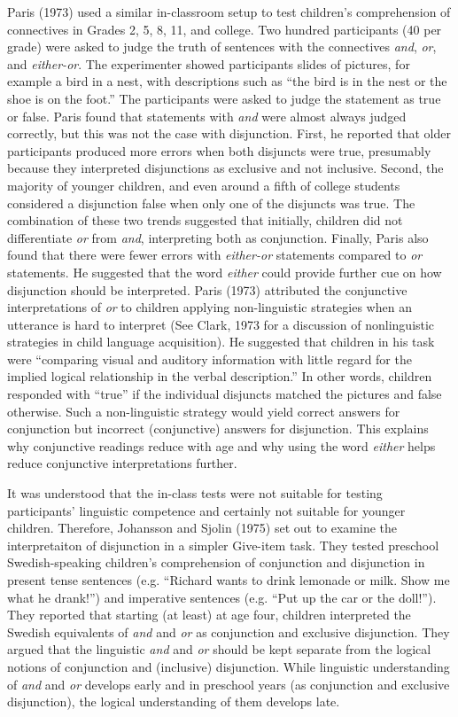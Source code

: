 \documentclass[floatsintext,man]{apa6}
\theoremstyle{definition}
\theoremstyle{definition}
\theoremstyle{definition}
\theoremstyle{remark}
\begin{document}
Paris (1973) used a similar in-classroom setup to test children's
comprehension of connectives in Grades 2, 5, 8, 11, and college. Two
hundred participants (40 per grade) were asked to judge the truth of
sentences with the connectives \emph{and}, \emph{or}, and
\emph{either-or}. The experimenter showed participants slides of
pictures, for example a bird in a nest, with descriptions such as
\enquote{the bird is in the nest or the shoe is on the foot.} The
participants were asked to judge the statement as true or false. Paris
found that statements with \emph{and} were almost always judged
correctly, but this was not the case with disjunction. First, he
reported that older participants produced more errors when both
disjuncts were true, presumably because they interpreted disjunctions as
exclusive and not inclusive. Second, the majority of younger children,
and even around a fifth of college students considered a disjunction
false when only one of the disjuncts was true. The combination of these
two trends suggested that initially, children did not differentiate
\emph{or} from \emph{and}, interpreting both as conjunction. Finally,
Paris also found that there were fewer errors with \emph{either-or}
statements compared to \emph{or} statements. He suggested that the word
\emph{either} could provide further cue on how disjunction should be
interpreted. Paris (1973) attributed the conjunctive interpretations of
\emph{or} to children applying non-linguistic strategies when an
utterance is hard to interpret (See Clark, 1973 for a discussion of
nonlinguistic strategies in child language acquisition). He suggested
that children in his task were \enquote{comparing visual and auditory
information with little regard for the implied logical relationship in
the verbal description.} In other words, children responded with
\enquote{true} if the individual disjuncts matched the pictures and
false otherwise. Such a non-linguistic strategy would yield correct
answers for conjunction but incorrect (conjunctive) answers for
disjunction. This explains why conjunctive readings reduce with age and
why using the word \emph{either} helps reduce conjunctive
interpretations further.

It was understood that the in-class tests were not suitable for testing
participants' linguistic competence and certainly not suitable for
younger children. Therefore, Johansson and Sjolin (1975) set out to
examine the interpretaiton of disjunction in a simpler Give-item task.
They tested preschool Swedish-speaking children's comprehension of
conjunction and disjunction in present tense sentences (e.g.
\enquote{Richard wants to drink lemonade or milk. Show me what he
drank!}) and imperative sentences (e.g. \enquote{Put up the car or the
doll!}). They reported that starting (at least) at age four, children
interpreted the Swedish equivalents of \emph{and} and \emph{or} as
conjunction and exclusive disjunction. They argued that the linguistic
\emph{and} and \emph{or} should be kept separate from the logical
notions of conjunction and (inclusive) disjunction. While linguistic
understanding of \emph{and} and \emph{or} develops early and in
preschool years (as conjunction and exclusive disjunction), the logical
understanding of them develops late.
\end{document}
